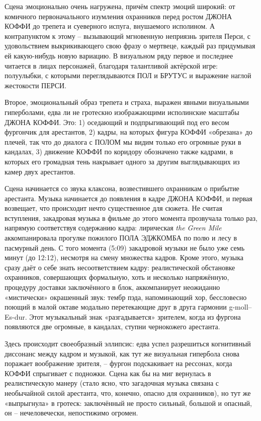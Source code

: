 Сцена эмоционально очень нагружена, причём спектр эмоций широкий: от комичного первоначального изумления охранников перед ростом ДЖОНА КОФФИ до трепета и суеверного испуга, внушаемого исполином.
А контрапунктом к этому -- вызывающий мгновенную неприязнь зрителя Перси, с удовольствием выкрикивающего свою фразу о мертвеце, каждый раз придумывая ей какую-нибудь новую вариацию.
В визуальном ряду первое и последнее читается в лицах персонажей, благодаря талантливой актёрской игре: полуулыбки, с которыми переглядываются ПОЛ и БРУТУС и выражение наглой жестокости ПЕРСИ.

Второе, эмоциональный образ трепета и страха, выражен явными визуальными гиперболами, едва ли не гротескно изображающими исполинские масштабы ДЖОНА КОФФИ.
Это: 1) оседающий и подпрыгивающий под его весом фургончик для арестантов, 2) кадры, на которых фигура КОФФИ «обрезана» до плечей, так что до диалога с ПОЛОМ мы видим только его огромные руки в кандалах, 3) движение КОФФИ по коридору обозначено также кадрами, в которых его громадная тень накрывает одного за другим выглядывающих из камер двух арестантов.

Сцена начинается со звука клаксона, возвестившего охранникам о прибытие арестанта.
Музыка начинается до появления в кадре ДЖОНА КОФФИ, и первая возвещает, что происходит нечто существенное для сюжета.
Не считая вступления, закадровая музыка в фильме до этого момента прозвучала только раз, напрямую соответствуя содержанию кадра: лирическая \emph{the Green Mile} аккомпанировала прогулке пожилого ПОЛА ЭДЖКОМБА по полю и лесу в пасмурный день.
С того момента (5:09) закадровой музыки не было уже семь минут (до 12:12), несмотря на смену множества кадров.
Кроме этого, музыка сразу даёт о себе знать несоответствием кадру: реалистической обстановке охранников, совершающих формальную, хоть и несколько напряжённую, процедуру доставки заключённого в блок, аккомпанирует неожиданно «мистически» окрашенный звук: тембр пэда, напоминающий хор, бессловесно поющий в малой октаве модально перетекающие друг в друга гармонии g-moll--Es-dur.
Этот музыкальный знак «разгадывается» зрителем, когда из фургона появляются две огромные, в кандалах, ступни чернокожего арестанта.

Здесь происходит своеобразный эллипсис: едва успел разрешиться когнитивный диссонанс между кадром и музыкой, как тут же визуальная гипербола снова поражает воображение зрителя, -- фургон подскакивает на рессонах, когда КОФФИ спрыгивает с подножки.
Сцена как бы на миг вернулась в реалистическую манеру (стало ясно, что загадочная музыка связана с необычайной силой арестанта, что, конечно, опасно для охранников), но тут же «выпрыгнула» в гротеск: заключённый не просто сильный, большой и опасный, он -- нечеловечески, непостижимо огромен.


